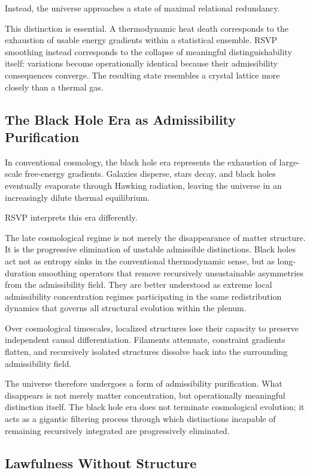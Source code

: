 \documentclass[12pt, a4paper]{article}
\begin{document}
Instead, the universe approaches a state of maximal relational redundancy.

This distinction is essential. A thermodynamic heat death corresponds to the
exhaustion of usable energy gradients within a statistical ensemble. RSVP
smoothing instead corresponds to the collapse of meaningful
distinguishability itself: variations become operationally identical because
their admissibility consequences converge. The resulting state resembles a
crystal lattice more closely than a thermal gas.

\subsection{The Black Hole Era as Admissibility Purification}

In conventional cosmology, the black hole era represents the exhaustion of
large-scale free-energy gradients. Galaxies disperse, stars decay, and black
holes eventually evaporate through Hawking radiation, leaving the universe
in an increasingly dilute thermal equilibrium.

RSVP interprets this era differently.

The late cosmological regime is not merely the disappearance of matter
structure. It is the progressive elimination of unstable admissible
distinctions. Black holes act not as entropy sinks in the conventional
thermodynamic sense, but as long-duration smoothing operators that remove
recursively unsustainable asymmetries from the admissibility field. They are
better understood as extreme local admissibility concentration regimes
participating in the same redistribution dynamics that governs all structural
evolution within the plenum.

Over cosmological timescales, localized structures lose their capacity to
preserve independent causal differentiation. Filaments attenuate, constraint
gradients flatten, and recursively isolated structures dissolve back into the
surrounding admissibility field.

The universe therefore undergoes a form of admissibility purification.
What disappears is not merely matter concentration, but operationally
meaningful distinction itself. The black hole era does not terminate
cosmological evolution; it acts as a gigantic filtering process through which
distinctions incapable of remaining recursively integrated are progressively
eliminated.

\subsection{Lawfulness Without Structure}
\end{document}
